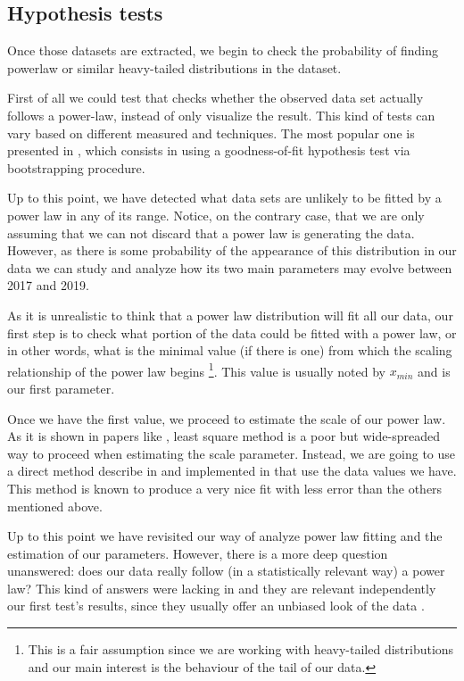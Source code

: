 \documentclass[conference]{IEEEtran}
\begin{document}
\subsection{Hypothesis tests}

Once those datasets are extracted, we begin to check the probability
of finding powerlaw or similar heavy-tailed distributions in the
dataset.

First of all we could test that checks whether the observed data set
actually follows a power-law, instead of only visualize the result.
This kind of tests can vary based on different measured and
techniques. The most popular one is presented in
\cite{clauset2009power}, which consists in using a goodness-of-fit
hypothesis test via bootstrapping procedure.


Up to this point, we have detected what data sets are unlikely to be
fitted by a power law in any of its range. Notice, on the contrary
case, that we are only assuming that we can not discard that a power
law is generating the data.  However, as there is some probability of
the appearance of this distribution in our data we can study and
analyze how its two main parameters may evolve between 2017 and 2019.

As it is unrealistic to think that a power law distribution will fit
all our data, our first step is to check what portion of the data
could be fitted with a power law, or in other words, what is the
minimal value (if there is one) from which the scaling relationship of
the power law begins \footnote{This is a fair assumption since we are
  working with heavy-tailed distributions and our main interest is the
  behaviour of the tail of our data.}.  This value is usually noted by
$x_{min}$ and is our first parameter.

Once we have the first value, we proceed to estimate the scale of our
power law.  As it is shown in papers like \cite{newman2005power,
  clauset2009power}, least square method is a poor but wide-spreaded
way to proceed when estimating the scale parameter. Instead, we are
going to use a direct method describe in \cite{clauset2009power} and
implemented in \cite{alstott2014powerlaw} that use the data values we
have. This method is known to produce a very nice fit with less error
than the others mentioned above.

Up to this point we have revisited our way of analyze power law
fitting and the estimation of our parameters. However, there is a more
deep question unanswered: does our data really follow (in a
statistically relevant way) a power law?  This kind of answers were
lacking in \cite{merelo2017self} and they are relevant independently
our first test's results, since they usually offer an unbiased look of
the data .
\end{document}
